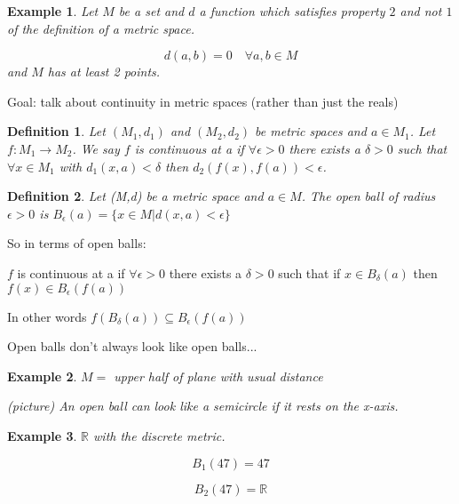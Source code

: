 \documentclass{article}
\newtheorem{Ex}{Example}
\newtheorem{Def}{Definition}
\begin{document}
\begin{Ex}

Let $M$ be a set and $d$ a function which satisfies property $2$ and not $1$ of the definition of a metric space.

$$d(a,b) = 0 \quad \forall a,b \in M$$ and $M$ has at least 2 points.

\end{Ex}

Goal: talk about continuity in metric spaces (rather than just the reals)

\begin{Def}

Let $(M_1, d_1)$ and $(M_2, d_2)$ be metric spaces and $a \in M_1$. Let $f:M_1 \rightarrow M_2$. We say $f$ is continuous at a if $\forall \epsilon > 0$ there exists a
$\delta > 0$ such that $\forall x\in M_1$ with $d_1 (x,a) <\delta$ then $d_2 (f(x), f(a))<\epsilon$.

\end{Def}

\bigskip

\bigskip

\bigskip

\bigskip


\begin{Def}

Let (M,d) be a metric space and $a\in M$. The open ball of radius $\epsilon >0$ is $B_\epsilon (a) = \{x\in M | d(x,a)<\epsilon \}$

\end{Def}

So in terms of open balls:

$f$ is continuous at a if $\forall\epsilon >0$ there exists a $\delta >0$ such that if $x\in B_\delta (a)$ then $f(x) \in B_\epsilon (f(a))$

In other words $f(B_\delta (a)) \subseteq B_\epsilon (f(a))$


Open balls don't always look like open balls...

\begin{Ex}

$M =$ upper half of plane with usual distance

(picture) An open ball can look like a semicircle if it rests on the x-axis.

\end{Ex}

\begin{Ex}

$\mathbb{R}$ with the discrete metric.

$$B_1 (47) = {47}$$

$$B_2 (47) = \mathbb{R}$$

\end{Ex}
\end{document}

